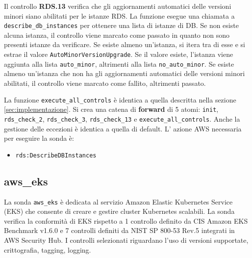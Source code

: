 Il controllo \textbf{RDS.13} verifica che gli aggiornamenti automatici delle versioni minori siano abilitati per le istanze RDS. La funzione esegue una chiamata a \texttt{describe\_db\_instances} per ottenere una lista di istanze di DB. Se non esiste alcuna istanza, il controllo viene marcato come passato in quanto non sono presenti istanze da verificare. Se esiste almeno un'istanza, si itera tra di esse e si estrae il valore \texttt{AutoMinorVersionUpgrade}. Se il valore esiste, l'istanza viene aggiunta alla lista \texttt{auto\_minor}, altrimenti alla lista \texttt{no\_auto\_minor}. Se esiste almeno un'istanza che non ha gli aggiornamenti automatici delle versioni minori abilitati, il controllo viene marcato come fallito, altrimenti passato.

La funzione \texttt{execute\_all\_controls} è identica a quella descritta nella sezione \ref{sec:implementazione}. Si crea una catena di \textbf{forward} di 5 atomi: \texttt{init}, \texttt{rds\_check\_2}, \texttt{rds\_check\_3}, \texttt{rds\_check\_13} e \texttt{execute\_all\_controls}. Anche la gestione delle eccezioni è identica a quella di default.
L' azione AWS necessaria per eseguire la sonda è:
\begin{itemize}
    \item \texttt{rds:DescribeDBInstances}
\end{itemize}

\subsection{aws\_eks}
\label{sec:eks}

La sonda \texttt{aws\_eks} è dedicata al servizio Amazon Elastic Kubernetes Service (EKS) che consente di creare e gestire cluster Kubernetes scalabili. La sonda verifica la conformità di EKS rispetto a 1 controllo definito da CIS Amazon EKS Benchmark v1.6.0 e 7 controlli definiti da NIST SP 800-53 Rev.5 integrati in AWS Security Hub. I controlli selezionati riguardano l'uso di versioni supportate, crittografia, tagging, logging.

